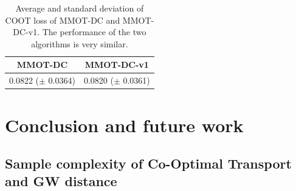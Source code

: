\begin{table}[H]
  \label{tab:coot_new}
  \begin{center}
    \begin{small}
      \begin{sc}
        \begin{tabular}{|c|c|}
          \hline
          MMOT-DC & MMOT-DC-v1 \\
          \hline
          0.0822 ($\pm$ 0.0364) & 0.0820 ($\pm$ 0.0361) \\
          \hline
        \end{tabular}
      \end{sc}
    \end{small}
  \end{center}
  \caption{Average and standard deviation of COOT loss of MMOT-DC and MMOT-DC-v1. The performance of the two algorithms is
  very similar.}
\end{table}

\section{Conclusion and future work}



\subsection{Sample complexity of Co-Optimal Transport and GW distance}
